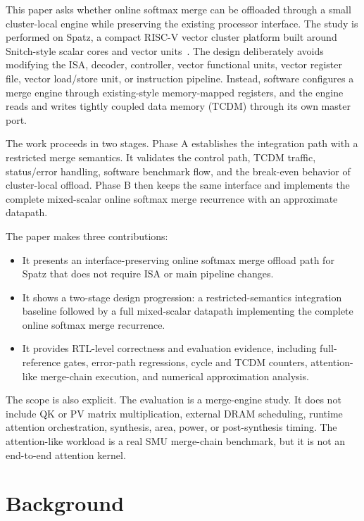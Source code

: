 \documentclass[conference]{IEEEtran}
\begin{document}
This paper asks whether online softmax merge can be offloaded through a small
cluster-local engine while preserving the existing processor interface. The
study is performed on Spatz, a compact RISC-V vector cluster platform built
around Snitch-style scalar cores and vector units~\cite{snitch2020,spatz2023}.
The design deliberately avoids modifying the ISA, decoder, controller, vector
functional units, vector register file, vector load/store unit, or instruction
pipeline. Instead, software configures a merge engine through existing-style
memory-mapped registers, and the engine reads and writes tightly coupled data
memory (TCDM) through its own master port.

The work proceeds in two stages. Phase A establishes the integration path with
a restricted merge semantics. It validates the control path, TCDM traffic,
status/error handling, software benchmark flow, and the break-even behavior of
cluster-local offload. Phase B then keeps the same interface and implements
the complete mixed-scalar online softmax merge recurrence with an approximate
datapath.

The paper makes three contributions:

\begin{itemize}
  \item It presents an interface-preserving online softmax merge offload path
        for Spatz that does not require ISA or main pipeline changes.
  \item It shows a two-stage design progression: a restricted-semantics
        integration baseline followed by a full mixed-scalar datapath
        implementing the complete online softmax merge recurrence.
  \item It provides RTL-level correctness and evaluation evidence, including
        full-reference gates, error-path regressions, cycle and TCDM counters,
        attention-like merge-chain execution, and numerical approximation
        analysis.
\end{itemize}

The scope is also explicit. The evaluation is a merge-engine study. It does
not include QK or PV matrix multiplication, external DRAM scheduling, runtime
attention orchestration, synthesis, area, power, or post-synthesis timing. The
attention-like workload is a real SMU merge-chain benchmark, but it is not an
end-to-end attention kernel.

\section{Background}
\end{document}

